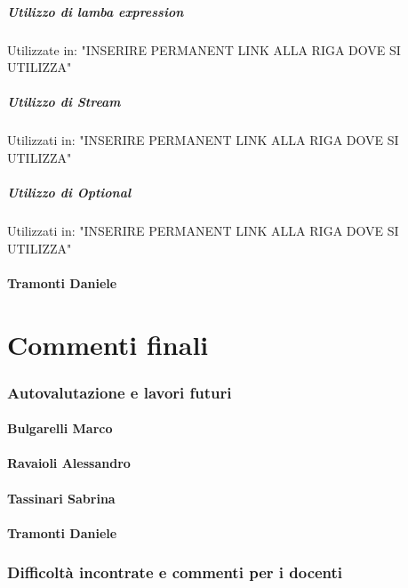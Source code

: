 \documentclass{report}
\begin{document}
\paragraph{Utilizzo di lamba expression}
Utilizzate in: "INSERIRE PERMANENT LINK ALLA RIGA DOVE SI UTILIZZA"

\paragraph{Utilizzo di Stream}
Utilizzati in: "INSERIRE PERMANENT LINK ALLA RIGA DOVE SI UTILIZZA"

\paragraph{Utilizzo di Optional}
Utilizzati in: "INSERIRE PERMANENT LINK ALLA RIGA DOVE SI UTILIZZA"

\subsubsection{Tramonti Daniele}

\chapter{Commenti finali}

\subsection{Autovalutazione e lavori futuri}

\subsubsection{Bulgarelli Marco}

\subsubsection{Ravaioli Alessandro}

\subsubsection{Tassinari Sabrina}

\subsubsection{Tramonti Daniele}

\subsection{Difficoltà incontrate e commenti per i docenti}
\end{document}
